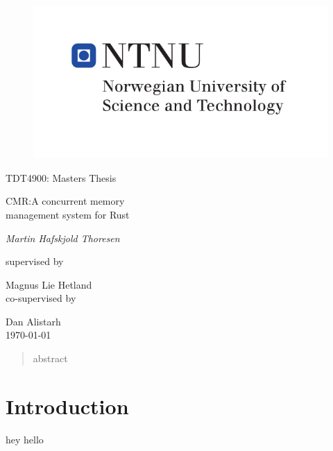 \documentclass[b5paper]{report}
\theoremstyle{plain}
\theoremstyle{definition}
\begin{document}
\begin{titlepage}
  \centering
  \begin{figure}[h]
    \centering
    \includegraphics{hovedlogo_eng.pdf}
  \end{figure}
  \vspace{1.5cm}
  {\Large TDT4900: Masters Thesis \par}
  \vspace{1cm}
  {\huge CMR:\@ A concurrent memory\\ management system for Rust\par}
  \vspace{2cm}
  {\Large\itshape{}Martin Hafskjold Thoresen\par}
  \vfill
  supervised by\par
  {\large Magnus Lie Hetland}\\
  \vspace{0.2cm}
  co-supervised by\par
  {\large Dan Alistarh}\\
  \vspace{1cm}
  {\large \today\\}
\end{titlepage}



\begin{abstract}
  abstract
\end{abstract}

\tableofcontents
\listoffigures
\listoftables

\chapter{Introduction}

hey hello\cite{linus}


\end{document}

